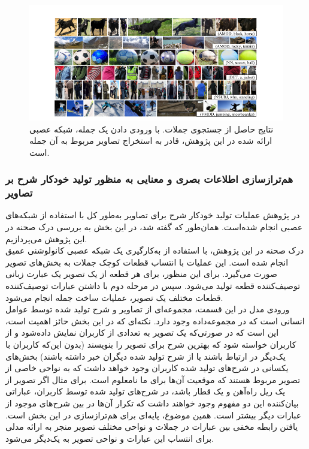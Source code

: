 \begin{figure}[H]
\center
\includegraphics[scale=0.6]{./Imgs/karpathy2014deep_res2.png}
\caption{نتایج حاصل از جستجوی جملات. با ورودی دادن یک جمله، شبکه عصبی ارائه شده در این پژوهش، قادر به استخراج تصاویر مربوط به آن جمله است.\cite{karpathy2014deep}}
\label{fig:k2014res2}
\end{figure}



\subsubsection[هم‌ترازسازی اطلاعات بصری و معنایی به منظور تولید خودکار شرح بر تصاویر]{هم‌ترازسازی اطلاعات بصری و معنایی به منظور تولید خودکار شرح بر تصاویر\cite{Karpathy_2015_CVPR}}
در پژوهش 
\cite{Karpathy_2015_CVPR}
عملیات تولید خودکار شرح برای تصاویر به‌طور کل با استفاده از شبکه‌های عصبی انجام شده‌است. همان‌طور که گفته شد، در این بخش به بررسی درک صحنه در این‌ پژوهش می‌پردازیم.\\
درک صحنه در این پژوهش، با استفاده از به‌کارگیری یک شبکه عصبی کانولوشنی عمیق انجام شده است. این عملیات با انتساب قطعات کوچک جملات به بخش‌های تصویر صورت می‌گیرد. برای این منظور، برای هر قطعه از یک تصویر یک عبارت زبانی توصیف‌کننده قطعه تولید می‌شود. سپس در مرحله دوم با داشتن عبارات توصیف‌کننده قطعات مختلف یک تصویر، عملیات ساخت جمله انجام می‌شود.
\\
ورودی مدل در این قسمت، مجموعه‌ای از تصاویر و شرح تولید شده توسط عوامل انسانی است که در مجموعه‌داده وجود دارد. نکته‌ای که در این بخش حائز اهمیت است، این است که در صورتی‌که یک تصویر به تعدادی از کاربران نمایش داده‌شود و از کاربران خواسته شود که بهترین شرح برای تصویر را بنویسند‌ (بدون این‌که کاربران با یک‌دیگر در ارتباط باشند یا از شرح تولید شده دیگران خبر داشته باشند) بخش‌های یکسانی در شرح‌های تولید شده کاربران وجود خواهد داشت که به نواحی خاصی از تصویر مربوط هستند که موقعیت آن‌ها برای ما نامعلوم است. برای مثال اگر تصویر از یک ریل راه‌آهن و یک قطار باشد، در شرح‌های تولید شده توسط کاربران، عباراتی بیان‌کننده این دو مفهوم وجود خواهند داشت که تکرار آن‌ها در بین شرح‌های موجود از عبارات دیگر بیشتر است. همین موضوع، پایه‌ای برای هم‌ترازسازی در این بخش است. یافتن رابطه مخفی بین عبارات در جملات و نواحی مختلف تصویر منجر به ارائه مدلی برای انتساب این عبارات و نواحی تصویر به یک‌دیگر می‌شود.
\\


\cite{karpathy2014deep}



